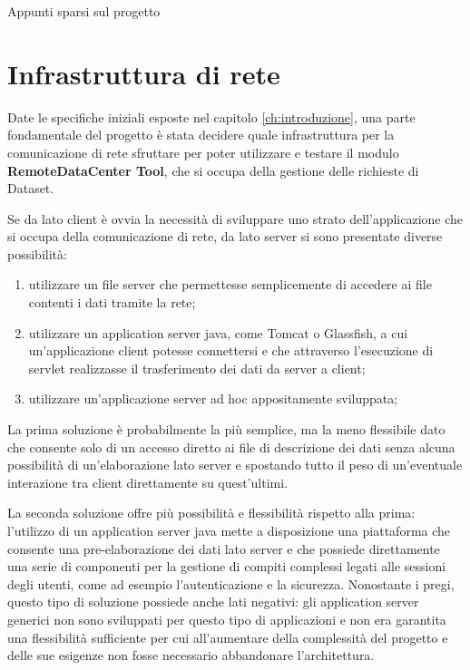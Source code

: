 
Appunti sparsi sul progetto

\section{Infrastruttura di rete} 
\label{sub:rete}
Date le specifiche iniziali esposte nel capitolo \ref{ch:introduzione}, una parte fondamentale del progetto è stata decidere quale infrastruttura per la comunicazione di rete sfruttare per poter utilizzare e testare il modulo \textbf{RemoteDataCenter Tool}, che si occupa della gestione delle richieste di Dataset.

Se da lato client è ovvia la necessità di sviluppare uno strato dell'applicazione che si occupa della comunicazione di rete, da lato server si sono presentate diverse possibilità: 
\begin{enumerate}
	\item  utilizzare un file server che permettesse semplicemente di accedere ai file contenti i dati tramite la rete;
	\item  utilizzare un application server java, come Tomcat o Glassfish, a cui un'applicazione client potesse connettersi e che attraverso l'esecuzione di servlet realizzasse il trasferimento dei dati da server a client;
	\item  utilizzare un'applicazione server ad hoc appositamente sviluppata;
\end{enumerate}

La prima soluzione è probabilmente la più semplice, ma la meno flessibile dato che consente solo di un accesso diretto ai file di descrizione dei dati senza alcuna possibilità di un'elaborazione lato server e spostando tutto il peso di un'eventuale interazione tra client direttamente su quest'ultimi.

La seconda soluzione offre più possibilità e flessibilità rispetto alla prima: l'utilizzo di un application server java mette a disposizione una piattaforma che consente una pre-elaborazione dei dati lato server e che possiede direttamente una serie di componenti per la gestione di compiti complessi legati alle sessioni degli utenti, come ad esempio l'autenticazione e la sicurezza. Nonostante i pregi, questo tipo di soluzione possiede anche lati negativi: gli application server generici non sono sviluppati per questo tipo di applicazioni e non era garantita una flessibilità sufficiente per cui all'aumentare della complessità del progetto e delle sue esigenze non fosse necessario abbandonare l'architettura. 

